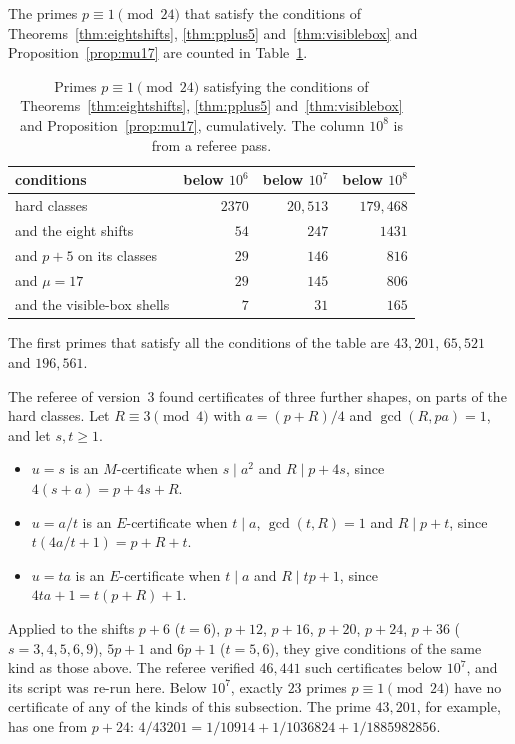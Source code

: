The primes $p\equiv1\pmod{24}$ that satisfy the conditions of Theorems~\ref{thm:eightshifts}, \ref{thm:pplus5} and~\ref{thm:visiblebox} and Proposition~\ref{prop:mu17} are counted in Table~\ref{tab:survivors}.

\begin{center}\small
\begin{longtable}{@{}lrrr@{}}
\caption{Primes $p\equiv1\pmod{24}$ satisfying the conditions of Theorems~\ref{thm:eightshifts}, \ref{thm:pplus5} and~\ref{thm:visiblebox} and Proposition~\ref{prop:mu17}, cumulatively. The column $10^8$ is from a referee pass.}\label{tab:survivors}\\
\toprule
conditions & below $10^6$ & below $10^7$ & below $10^8$\\
\midrule
hard classes & $2370$ & $20{,}513$ & $179{,}468$\\
and the eight shifts & $54$ & $247$ & $1431$\\
and $p+5$ on its classes & $29$ & $146$ & $816$\\
and $\mu=17$ & $29$ & $145$ & $806$\\
and the visible-box shells & $7$ & $31$ & $165$\\
\bottomrule
\end{longtable}
\end{center}

The first primes that satisfy all the conditions of the table are $43{,}201$, $65{,}521$ and $196{,}561$.

The referee of version~3 found certificates of three further shapes, on parts of the hard classes. Let $R\equiv3\pmod4$ with $a=(p+R)/4$ and $\gcd(R,pa)=1$, and let $s,t\ge1$.
\begin{itemize}
\item $u=s$ is an $M$-certificate when $s\mid a^2$ and $R\mid p+4s$, since $4(s+a)=p+4s+R$.
\item $u=a/t$ is an $E$-certificate when $t\mid a$, $\gcd(t,R)=1$ and $R\mid p+t$, since $t(4a/t+1)=p+R+t$.
\item $u=ta$ is an $E$-certificate when $t\mid a$ and $R\mid tp+1$, since $4ta+1=t(p+R)+1$.
\end{itemize}
Applied to the shifts $p+6$ ($t=6$), $p+12$, $p+16$, $p+20$, $p+24$, $p+36$ ($s=3,4,5,6,9$), $5p+1$ and $6p+1$ ($t=5,6$), they give conditions of the same kind as those above. The referee verified $46{,}441$ such certificates below $10^7$, and its script was re-run here. Below $10^7$, exactly $23$ primes $p\equiv1\pmod{24}$ have no certificate of any of the kinds of this subsection. The prime $43{,}201$, for example, has one from $p+24$: $4/43201=1/10914+1/1036824+1/1885982856$.

